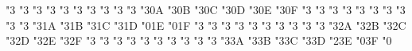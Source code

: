 
\mathchardef \lvertneqq   "3
\mathchardef \gvertneqq   "3
\mathchardef \nleq   "3
\mathchardef \ngeq   "3
\mathchardef \nless   "3
\mathchardef \ngtr   "3
\mathchardef \nprec   "3
\mathchardef \nsucc   "3
\mathchardef \lneqq   "3
\mathchardef \gneqq   "3
\mathchardef \nleqslant   "3\amsbfam 0A
\mathchardef \ngeqslant   "3\amsbfam 0B
\mathchardef \lneq   "3\amsbfam 0C
\mathchardef \gneq   "3\amsbfam 0D
\mathchardef \npreceq   "3\amsbfam 0E
\mathchardef \nsucceq   "3\amsbfam 0F
\mathchardef \precnsim   "3
\mathchardef \succnsim   "3
\mathchardef \lnsim   "3
\mathchardef \gnsim   "3
\mathchardef \nleqq   "3
\mathchardef \ngeqq   "3
\mathchardef \precneqq   "3
\mathchardef \succneqq   "3
\mathchardef \precnapprox   "3
\mathchardef \succnapprox   "3
\mathchardef \lnapprox   "3\amsbfam 1A
\mathchardef \gnapprox   "3\amsbfam 1B
\mathchardef \nsim   "3\amsbfam 1C
\mathchardef \ncong   "3\amsbfam 1D
\mathchardef \diagup   "0\amsbfam 1E
\mathchardef \diagdown   "0\amsbfam 1F
\mathchardef \varsubsetneq   "3
\mathchardef \varsupsetneq   "3
\mathchardef \nsubseteqq   "3
\mathchardef \nsupseteqq   "3
\mathchardef \subsetneqq   "3
\mathchardef \supsetneqq   "3
\mathchardef \varsubsetneqq   "3
\mathchardef \varsupsetneqq   "3
\mathchardef \subsetneq   "3
\mathchardef \supsetneq   "3
\mathchardef \nsubseteq   "3\amsbfam 2A
\mathchardef \nsupseteq   "3\amsbfam 2B
\mathchardef \nparallel   "3\amsbfam 2C
\mathchardef \nmid   "3\amsbfam 2D
\mathchardef \nshortmid   "3\amsbfam 2E
\mathchardef \nshortparallel   "3\amsbfam 2F
\mathchardef \nvdash   "3
\mathchardef \nVdash   "3
\mathchardef \nvDash   "3
\mathchardef \nVDash   "3
\mathchardef \ntrianglerighteq   "3
\mathchardef \ntrianglelefteq   "3
\mathchardef \ntriangleleft   "3
\mathchardef \ntriangleright   "3
\mathchardef \nleftarrow   "3
\mathchardef \nrightarrow   "3
\mathchardef \nLeftarrow   "3\amsbfam 3A
\mathchardef \nRightarrow   "3\amsbfam 3B
\mathchardef \nLeftrightarrow   "3\amsbfam 3C
\mathchardef \nleftrightarrow   "3\amsbfam 3D
\mathchardef \divideontimes   "2\amsbfam 3E
\mathchardef \varnothing   "0\amsbfam 3F
\mathchardef \nexists   "0
